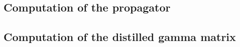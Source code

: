 \subsection{Computation of the propagator}

\subsection{Computation of the distilled gamma matrix}
    